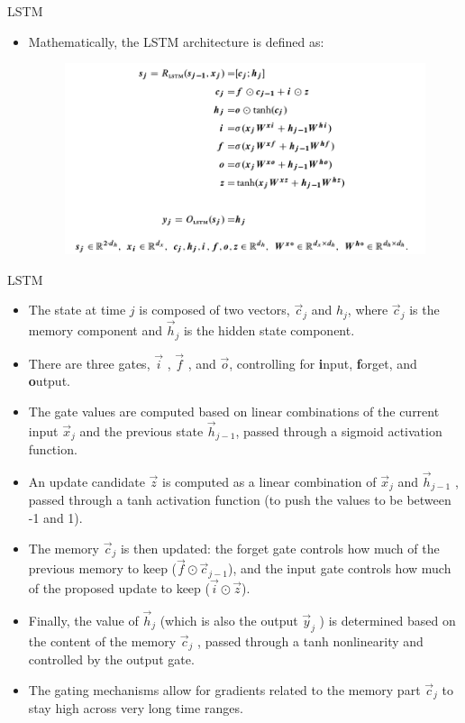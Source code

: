 \documentclass[handout]{beamer}
\begin{document}
\begin{frame}{LSTM}
\begin{scriptsize}

\begin{itemize}
\item Mathematically, the LSTM architecture is defined as:
  \begin{figure}[h]
        	\includegraphics[scale = 0.35]{pics/LSTMform.png}
        \end{figure}
\end{itemize}
\end{scriptsize}
\end{frame}


\begin{frame}{LSTM}
\begin{scriptsize}

\begin{itemize}
\item The state at time $j$ is composed of two vectors, $\vec{c}_j$ and $h_{j}$, where $\vec{c}_j$ is the memory component and $\vec{h}_j$ is the hidden state component.
\item There are three gates, $\vec{i}$ , $\vec{f}$ , and $\vec{o}$, controlling for \textbf{i}nput, \textbf{f}orget, and \textbf{o}utput.
\item The gate values are computed based on linear combinations of the current input $\vec{x}_j$ and the previous state $\vec{h}_{j-1}$, passed through a sigmoid activation function.
\item An update candidate $\vec{z}$ is computed as a linear combination of $\vec{x}_j$ and $\vec{h}_{j-1}$ , passed through a tanh activation function (to push the values to be between -1 and 1).
\item The memory $\vec{c}_j$ is then updated: the forget gate controls how much of the previous memory to keep ($\vec{f} \odot \vec{c}_{j-1}$), and the input gate controls how much of the proposed update to keep ($\vec{i} \odot  \vec{z}$). 
\item Finally, the value of $\vec{h}_j$ (which is also the output $\vec{y}_j$ ) is determined based on the content of the memory $\vec{c}_j$ , passed through a tanh nonlinearity and controlled by the output gate. 
\item The gating mechanisms allow for gradients related to the memory part $\vec{c}_j$ to stay high across very long time ranges.
\end{itemize}
\end{scriptsize}
\end{frame}
\end{document}
